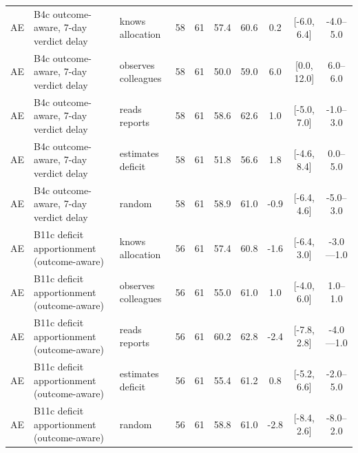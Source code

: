 \documentclass[10pt,onecolumn,letterpaper]{article}
\begin{document}
\begin{table}[!t]
\begin{tabular}{lllccccccc}
AE & B4c outcome-aware, 7-day verdict delay & knows allocation & 58 & 61 & 57.4 & 60.6 & 0.2 & [-6.0, 6.4] & -4.0--5.0 \\
AE & B4c outcome-aware, 7-day verdict delay & observes colleagues & 58 & 61 & 50.0 & 59.0 & 6.0 & [0.0, 12.0] & 6.0--6.0 \\
AE & B4c outcome-aware, 7-day verdict delay & reads reports & 58 & 61 & 58.6 & 62.6 & 1.0 & [-5.0, 7.0] & -1.0--3.0 \\
AE & B4c outcome-aware, 7-day verdict delay & estimates deficit & 58 & 61 & 51.8 & 56.6 & 1.8 & [-4.6, 8.4] & 0.0--5.0 \\
AE & B4c outcome-aware, 7-day verdict delay & random & 58 & 61 & 58.9 & 61.0 & -0.9 & [-6.4, 4.6] & -5.0--3.0 \\
AE & B11c deficit apportionment (outcome-aware) & knows allocation & 56 & 61 & 57.4 & 60.8 & -1.6 & [-6.4, 3.0] & -3.0---1.0 \\
AE & B11c deficit apportionment (outcome-aware) & observes colleagues & 56 & 61 & 55.0 & 61.0 & 1.0 & [-4.0, 6.0] & 1.0--1.0 \\
AE & B11c deficit apportionment (outcome-aware) & reads reports & 56 & 61 & 60.2 & 62.8 & -2.4 & [-7.8, 2.8] & -4.0---1.0 \\
AE & B11c deficit apportionment (outcome-aware) & estimates deficit & 56 & 61 & 55.4 & 61.2 & 0.8 & [-5.2, 6.6] & -2.0--5.0 \\
AE & B11c deficit apportionment (outcome-aware) & random & 56 & 61 & 58.8 & 61.0 & -2.8 & [-8.4, 2.6] & -8.0--2.0 \\
\bottomrule
\end{tabular}
\end{table}
\end{document}
